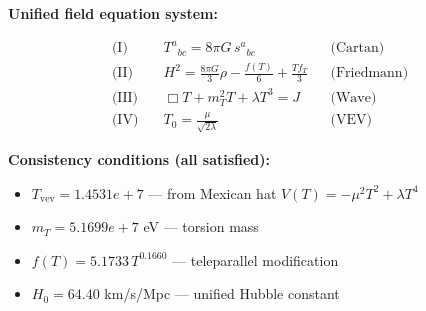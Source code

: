
\textbf{Unified field equation system:}

\begin{align}
  \text{(I)} \quad & T^a{}_{bc} = 8\pi G \, s^a{}_{bc} && \text{(Cartan)} \\
  \text{(II)} \quad & H^2 = \frac{8\pi G}{3}\rho - \frac{f(T)}{6} + \frac{Tf_T}{3} && \text{(Friedmann)} \\
  \text{(III)} \quad & \Box T + m_T^2 T + \lambda T^3 = J && \text{(Wave)} \\
  \text{(IV)} \quad & T_0 = \frac{\mu}{\sqrt{2\lambda}} && \text{(VEV)}
\end{align}

\textbf{Consistency conditions (all satisfied):}
\begin{itemize}
  \item $T_{\text{vev}} = 1.4531e+7$ — from Mexican hat $V(T) = -\mu^2 T^2 + \lambda T^4$
  \item $m_T = 5.1699e+7$ eV — torsion mass
  \item $f(T) = 5.1733 \, T^{0.1660}$ — teleparallel modification
  \item $H_0 = 64.40$ km/s/Mpc — unified Hubble constant
\end{itemize}